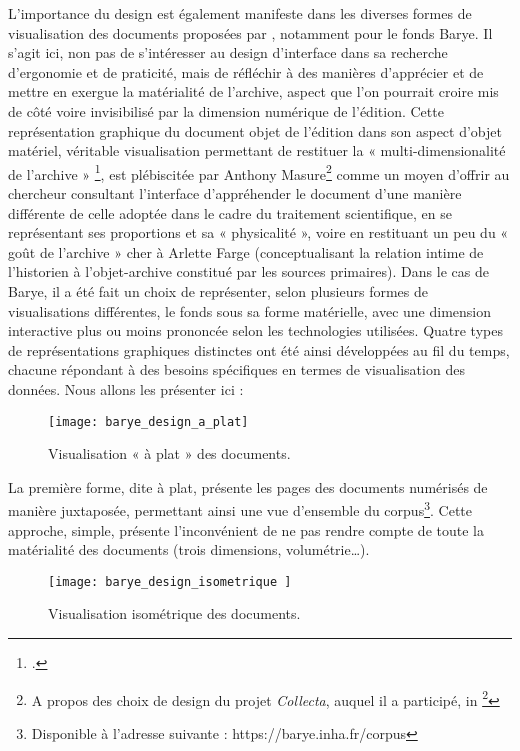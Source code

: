 L’importance du design est également manifeste dans les diverses formes de visualisation des documents proposées par \pense, notamment pour le fonds Barye. Il s’agit ici, non pas de s’intéresser au design d’interface dans sa recherche d’ergonomie et de praticité, mais de réfléchir à des manières d’apprécier et de mettre en exergue la matérialité de l’archive, aspect que l’on pourrait croire mis de côté voire invisibilisé par la dimension numérique de l’édition. Cette représentation graphique du document objet de l’édition dans son aspect d’objet matériel, véritable visualisation permettant de restituer la « multi-dimensionalité de l’archive » \footcite[p.83]{chateau-dutier_editions_2021}, est plébiscitée par Anthony Masure\footnote{A propos des choix de design du projet \textit{Collecta}, auquel il a participé, in \footcite[16ème minute]{masure_design_2017}} comme un moyen d’offrir au chercheur consultant l’interface d’appréhender le document d’une manière différente de celle adoptée dans le cadre du traitement scientifique, en se représentant ses proportions et sa « physicalité », voire en restituant un peu du « goût de l’archive » cher à Arlette Farge (conceptualisant la relation intime de l’historien à l’objet-archive constitué par les sources primaires). 
Dans le cas de Barye, il a été fait un choix de représenter, selon plusieurs formes de visualisations différentes, le fonds sous sa forme matérielle, avec une dimension interactive plus ou moins prononcée selon les technologies utilisées. 
Quatre types de représentations graphiques distinctes ont été ainsi développées au fil du temps, chacune répondant à des besoins spécifiques en termes de visualisation des données. 
Nous allons les présenter ici : 

\begin{figure}[h] 
        \centering 
        \texttt{[image: barye\_design\_a\_plat]} 
        \caption{Visualisation « à plat » des documents.} 
        \label{fig:visualisation-plat} 
\end{figure}

La première forme, dite à plat, présente les pages des documents numérisés de manière juxtaposée, permettant ainsi une vue d'ensemble du corpus\footnote{Disponible à l’adresse suivante : https://barye.inha.fr/corpus}. Cette approche, simple, présente l'inconvénient de ne pas rendre compte de toute la matérialité des documents (trois dimensions, volumétrie…). 

\begin{figure}[h] 
        \centering 
        \texttt{[image: barye\_design\_isometrique ]} 
        \caption{Visualisation isométrique des documents.} 
        \label{fig:visualisation-iso} 
\end{figure}

